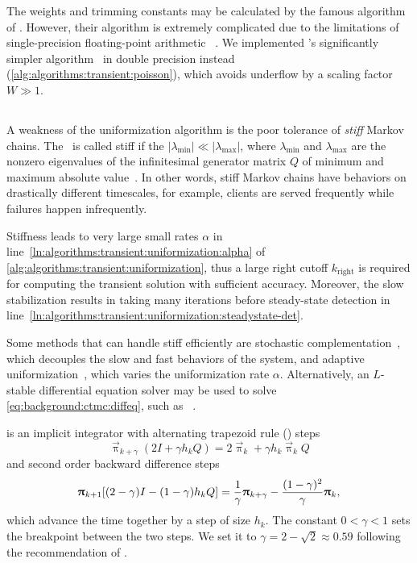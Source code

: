 The weights and trimming constants may be calculated by the famous
algorithm of \citet{DBLP:journals/cacm/FoxG88}. However, their
algorithm is extremely complicated due to the limitations of
single-precision floating-point arithmetic%
~\citep{jansen2011understanding}. We implemented
\citeauthor{DBLP:journals/corr/Burak14}'s significantly simpler
algorithm~\citep{DBLP:journals/corr/Burak14} in double precision
instead (\vref{alg:algorithms:transient:poisson}), which avoids
underflow by a scaling factor $W \gg 1$.

\subsection{}
\label{ssec:algorithms:trbdf2}

A weakness of the uniformization algorithm is the poor tolerance of
\emph{stiff} Markov chains. The \CTMC\ is called stiff if the
$\lvert \lambda_{\min} \rvert \ll \lvert \lambda_{\max} \rvert$, where
$\lambda_{\min}$ and $\lambda_{\max}$ are the nonzero eigenvalues of
the infinitesimal generator matrix $Q$ of minimum and maximum absolute
value~\citep{DBLP:journals/cor/ReibmanT88}. In other words, stiff
Markov chains have behaviors on drastically different timescales, for
example, clients are served frequently while failures happen
infrequently.

Stiffness leads to very large small rates $\alpha$
in line~\ref{ln:algorithms:transient:uniformization:alpha} of
\vref{alg:algorithms:transient:uniformization}, thus a large right
cutoff $k_{\text{right}}$ is required for computing the transient
solution with sufficient accuracy. Moreover, the slow stabilization
results in taking many iterations before steady-state detection
in line~\ref{ln:algorithms:transient:uniformization:steadystate-det}.

Some methods that can handle stiff  efficiently are
stochastic complementation~\citep{meyer1989stochastic}, which
decouples the slow and fast behaviors of the system, and adaptive
uniformization~\citep{van1994adaptive}, which varies the uniformization
rate $\alpha$. Alternatively, an $L$-stable differential equation
solver may be used to solve \vref{eq:background:ctmc:diffeq}, such as
\mbox{}~\citep{DBLP:journals/cor/ReibmanT88,%
DBLP:journals/tcad/BankCFGRS85}.

 is an implicit integrator with alternating trapezoid
rule () steps
\begin{equation}
  \vec{\uppi}_{k + \gamma} (2I + \gamma h_k Q) = 2 \vec{\uppi}_{k} +
  \gamma h_k \vec{\uppi}_k Q
\end{equation}
and second order backward difference steps
\begin{equation}
  \vec{\uppi}_{k + 1} [(2 - \gamma) I - (1 - \gamma) h_k Q] =
  \frac{1}{\gamma} \vec{\uppi}_{k + \gamma} - \frac{(1 -
    \gamma)^2}{\gamma} \vec{\uppi}_k \text,
\end{equation}
which advance the time together by a step of size $h_k$. The constant
$0 < \gamma < 1$ sets the breakpoint between the two steps. We set it
to $\gamma = 2 - \sqrt{2} \approx 0.59$ following the recommendation
of \citet{DBLP:journals/tcad/BankCFGRS85}.

